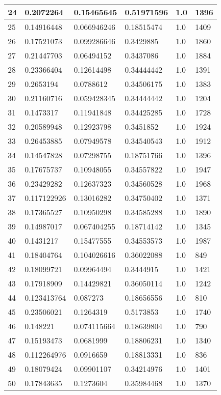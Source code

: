 \begin{longtable}{|l|l|l|l|l|l|}
24 & 0.2072264 & 0.15465645 & 0.51971596 & 1.0 & 1396 \\ \hline 
25 & 0.14916448 & 0.066946246 & 0.18515474 & 1.0 & 1409 \\ \hline 
26 & 0.17521073 & 0.099286646 & 0.3429885 & 1.0 & 1860 \\ \hline 
27 & 0.21447703 & 0.06494152 & 0.3437086 & 1.0 & 1884 \\ \hline 
28 & 0.23366404 & 0.12614498 & 0.34444442 & 1.0 & 1391 \\ \hline 
29 & 0.2653194 & 0.0788612 & 0.34506175 & 1.0 & 1383 \\ \hline 
30 & 0.21160716 & 0.059428345 & 0.34444442 & 1.0 & 1204 \\ \hline 
31 & 0.1473317 & 0.11941848 & 0.34425285 & 1.0 & 1728 \\ \hline 
32 & 0.20589948 & 0.12923798 & 0.3451852 & 1.0 & 1924 \\ \hline 
33 & 0.26453885 & 0.07949578 & 0.34540543 & 1.0 & 1912 \\ \hline 
34 & 0.14547828 & 0.07298755 & 0.18751766 & 1.0 & 1396 \\ \hline 
35 & 0.17675737 & 0.10948055 & 0.34557822 & 1.0 & 1947 \\ \hline 
36 & 0.23429282 & 0.12637323 & 0.34560528 & 1.0 & 1968 \\ \hline 
37 & 0.117122926 & 0.13016282 & 0.34750402 & 1.0 & 1371 \\ \hline 
38 & 0.17365527 & 0.10950298 & 0.34585288 & 1.0 & 1890 \\ \hline 
39 & 0.14987017 & 0.067404255 & 0.18714142 & 1.0 & 1345 \\ \hline 
40 & 0.1431217 & 0.15477555 & 0.34553573 & 1.0 & 1987 \\ \hline 
41 & 0.18404764 & 0.104026616 & 0.36022088 & 1.0 & 849 \\ \hline 
42 & 0.18099721 & 0.09964494 & 0.3444915 & 1.0 & 1421 \\ \hline 
43 & 0.17918909 & 0.14429821 & 0.36050114 & 1.0 & 1242 \\ \hline 
44 & 0.123413764 & 0.087273 & 0.18656556 & 1.0 & 810 \\ \hline 
45 & 0.23506021 & 0.1264319 & 0.5173853 & 1.0 & 1740 \\ \hline 
46 & 0.148221 & 0.074115664 & 0.18639804 & 1.0 & 790 \\ \hline 
47 & 0.15193473 & 0.0681999 & 0.18806231 & 1.0 & 1340 \\ \hline 
48 & 0.112264976 & 0.0916659 & 0.18813331 & 1.0 & 836 \\ \hline 
49 & 0.18079424 & 0.09901107 & 0.34214976 & 1.0 & 1401 \\ \hline 
50 & 0.17843635 & 0.1273604 & 0.35984468 & 1.0 & 1370 \\ \hline 
\end{longtable}
